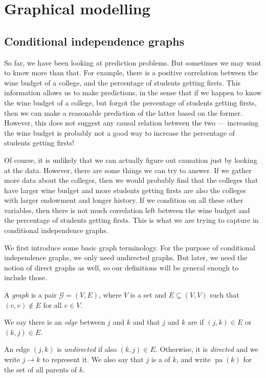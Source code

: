 \documentclass[a4paper]{article}
\DeclareMathOperator\pa{pa}
\begin{document}
\section{Graphical modelling}
\subsection{Conditional independence graphs}
So far, we have been looking at prediction problems. But sometimes we may want to know more than that. For example, there is a positive correlation between the wine budget of a college, and the percentage of students getting firsts. This information allows us to make predictions, in the sense that if we happen to know the wine budget of a college, but forgot the percentage of students getting firsts, then we can make a reasonable prediction of the latter based on the former. However, this does not suggest any causal relation between the two --- increasing the wine budget is probably not a good way to increase the percentage of students getting firsts!

Of course, it is unlikely that we can actually figure out causation just by looking at the data. However, there are some things we can try to answer. If we gather more data about the colleges, then we would probably find that the colleges that have larger wine budget and more students getting firsts are also the colleges with larger endowment and longer history. If we condition on all these other variables, then there is not much correlation left between the wine budget and the percentage of students getting firsts. This is what we are trying to capture in conditional independence graphs.

We first introduce some basic graph terminology. For the purpose of conditional independence graphs, we only need undirected graphs. But later, we need the notion of direct graphs as well, so our definitions will be general enough to include those.
\begin{defi}[Graph]
  A \emph{graph} is a pair $\mathcal{G} = (V, E)$, where $V$ is a set and $E \subseteq (V, V)$ such that $(v, v) \not \in E$ for all $v \in V$.
\end{defi}

\begin{defi}[Edge]
  We say there is an \emph{edge} between $j$ and $k$ and that $j$ and $k$ are  if $(j, k) \in E$ or $(k, j) \in E$.
\end{defi}

\begin{defi}
  An edge $(j, k)$ is \emph{undirected} if also $(k, j) \in E$. Otherwise, it is \emph{directed} and we write $j \to k$ to represent it. We also say that $j$ is a  of $k$, and write $\pa(k)$ for the set of all parents of $k$.
\end{defi}
\end{document}
